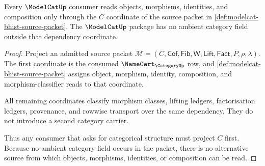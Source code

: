 \begin{theorem}
\label{thm:modelcat-category-dependency-boundary}
Every $\ModelCatUp$ consumer reads objects, morphisms, identities, and
composition only through the $C$ coordinate of the source packet in
\autoref{def:modelcat-bhist-source-packet}. The $\ModelCatUp$ package has no
ambient category field outside that dependency coordinate.
\end{theorem}
\begin{proof}
Project an admitted source packet
$\mathcal{M}=(C,\mathsf{Cof},\mathsf{Fib},\mathsf{W},\mathsf{Lift},\mathsf{Fact},P,\rho,\lambda)$.
The first coordinate is the consumed $\NameCert_{\CategoryUp}$ row, and
\autoref{def:modelcat-bhist-source-packet} assigns object, morphism, identity,
composition, and morphism-classifier reads to that coordinate.

All remaining coordinates classify morphism classes, lifting ledgers,
factorisation ledgers, provenance, and rowwise transport over the same
dependency. They do not introduce a second category carrier.

Thus any consumer that asks for categorical structure must project $C$ first.
Because no ambient category field occurs in the packet, there is no alternative
source from which objects, morphisms, identities, or composition can be read.
\end{proof}

